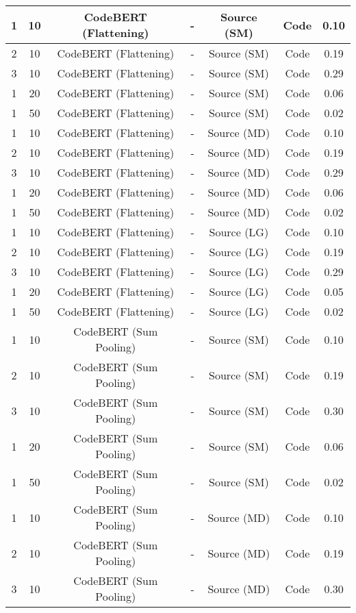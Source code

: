 \begin{longtable}{|c|c|c|c|c|c|c|}
\hline
1 & 10 & CodeBERT (Flattening) & - & Source (SM) & Code & 0.10 \\
\hline
2 & 10 & CodeBERT (Flattening) & - & Source (SM) & Code & 0.19 \\
\hline
3 & 10 & CodeBERT (Flattening) & - & Source (SM) & Code & 0.29 \\
\hline
1 & 20 & CodeBERT (Flattening) & - & Source (SM) & Code & 0.06 \\
\hline
1 & 50 & CodeBERT (Flattening) & - & Source (SM) & Code & 0.02 \\
\hline
1 & 10 & CodeBERT (Flattening) & - & Source (MD) & Code & 0.10 \\
\hline
2 & 10 & CodeBERT (Flattening) & - & Source (MD) & Code & 0.19 \\
\hline
3 & 10 & CodeBERT (Flattening) & - & Source (MD) & Code & 0.29 \\
\hline
1 & 20 & CodeBERT (Flattening) & - & Source (MD) & Code & 0.06 \\
\hline
1 & 50 & CodeBERT (Flattening) & - & Source (MD) & Code & 0.02 \\
\hline
1 & 10 & CodeBERT (Flattening) & - & Source (LG) & Code & 0.10 \\
\hline
2 & 10 & CodeBERT (Flattening) & - & Source (LG) & Code & 0.19 \\
\hline
3 & 10 & CodeBERT (Flattening) & - & Source (LG) & Code & 0.29 \\
\hline
1 & 20 & CodeBERT (Flattening) & - & Source (LG) & Code & 0.05 \\
\hline
1 & 50 & CodeBERT (Flattening) & - & Source (LG) & Code & 0.02 \\
\hline
1 & 10 & CodeBERT (Sum Pooling) & - & Source (SM) & Code & 0.10 \\
\hline
2 & 10 & CodeBERT (Sum Pooling) & - & Source (SM) & Code & 0.19 \\
\hline
3 & 10 & CodeBERT (Sum Pooling) & - & Source (SM) & Code & 0.30 \\
\hline
1 & 20 & CodeBERT (Sum Pooling) & - & Source (SM) & Code & 0.06 \\
\hline
1 & 50 & CodeBERT (Sum Pooling) & - & Source (SM) & Code & 0.02 \\
\hline
1 & 10 & CodeBERT (Sum Pooling) & - & Source (MD) & Code & 0.10 \\
\hline
2 & 10 & CodeBERT (Sum Pooling) & - & Source (MD) & Code & 0.19 \\
\hline
3 & 10 & CodeBERT (Sum Pooling) & - & Source (MD) & Code & 0.30 \\

\end{longtable}
